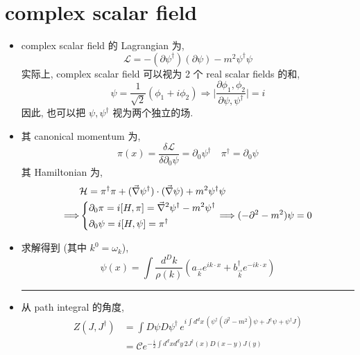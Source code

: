 \section{complex scalar field}
\begin{itemize}
	\item complex scalar field 的 Lagrangian 为,
	\begin{equation}
		\mathcal{L} = - (\partial \psi^\dag) (\partial \psi) - m^2 \psi^\dag \psi
	\end{equation}
	实际上, complex scalar field 可以视为 2 个 real scalar fields 的和,
	\begin{equation}
		\psi = \frac{1}{\sqrt{2}} (\phi_1 + i \phi_2) \Longrightarrow \Big| \frac{\partial \phi_1, \phi_2}{\partial \psi, \psi^\dag} \Big| = i
	\end{equation}
	因此, 也可以把 $\psi, \psi^\dag$ 视为两个独立的场.
	
	\item 其 canonical momentum 为,
	\begin{equation}
		\pi(x) = \frac{\delta \mathcal{L}}{\delta \partial_0 \psi} = \partial_0 \psi^\dag \quad \pi^\dag = \partial_0 \psi
	\end{equation}
	其 Hamiltonian 为,
	\begin{align}
		& \mathcal{H} = \pi^\dag \pi + (\vec{\nabla} \psi^\dag) \cdot (\vec{\nabla} \psi) + m^2 \psi^\dag \psi \\
		\Longrightarrow & \begin{dcases}
			\partial_0 \pi = i [H, \pi] = \vec{\nabla}^2 \psi^\dag - m^2 \psi^\dag \\
			\partial_0 \psi = i [H, \psi] = \pi^\dag
		\end{dcases} \Longrightarrow (- \partial^2 - m^2) \psi = 0
	\end{align}
	
	\item 求解得到 (其中 $k^0 = \omega_k$),
	\begin{equation}
		\psi(x) = \int \frac{d^D k}{\rho(k)} (a_{\vec{k}} e^{i k \cdot x} + b^\dag_{\vec{k}} e^{- i k \cdot x})
	\end{equation}
	
	\noindent\rule[0.5ex]{\linewidth}{0.5pt} %
	
	\item 从 path integral 的角度,
	\begin{align}
		Z(J, J^\dag) &= \int D\psi D\psi^\dag \, e^{i \int d^d x \, (\psi^\dag (\partial^2 - m^2) \psi + J^\dag \psi + \psi^\dag J)} \\
		&= \mathcal{C} e^{- \frac{i}{2} \int d^d x d^d y \, 2 J^\dag(x) D(x - y) J(y)}
	\end{align}
	

\end{itemize}
